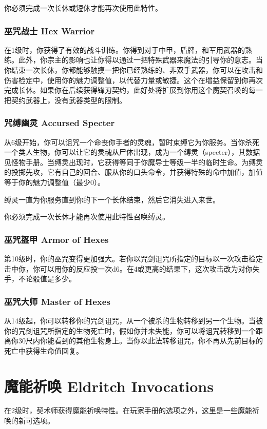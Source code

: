 你必须完成一次长休或短休才能再次使用此特性。

\subsubsection{巫咒战士 Hex Warrior}在1级时，你获得了有效的战斗训练。你得到对于中甲，盾牌，和军用武器的熟练。此外，你宗主的影响也让你得以通过一把特殊武器来魔法的引导你的意志。当你结束一次长休，你都能够触摸一把你已经熟练的、非双手武器，你可以在攻击和伤害检定中，使用你的魅力调整值，以代替力量或敏捷。这个在增益保留到你再次完成长休。如果你在后续获得锋刃契约，此好处将扩展到你用这个魔契召唤的每一把契约武器上，没有武器类型的限制。


\subsubsection{咒缚幽灵 Accursed Specter}从6级开始，你可以诅咒一个命丧你手者的灵魂，暂时束缚它为你服务。当你杀死一个类人生物，你可以让它的灵魂从尸体出现，成为一个缚灵（specter），其数据见怪物手册。当缚灵出现时，它获得等同于你魔导士等级一半的临时生命。为缚灵的投掷先攻，它有自己的回合、服从你的口头命令，并获得特殊的命中加值，加值等于你的魅力调整值（最少0）。

缚灵一直为你服务直到你的下一个长休结束，然后它消失进入来世。

你必须完成一次长休才能再次使用此特性召唤缚灵。

\subsubsection{巫咒盔甲 Armor of Hexes}第10级时，你的巫咒变得更加强大。若你以咒剑诅咒所指定的目标以一次攻击检定击中你，你可以用你的反应投一次d6。在4或更高的结果下，这次攻击改为对你失手，不论骰值是多少。

\subsubsection{巫咒大师 Master of Hexes}从14级起，你可以转移你的咒剑诅咒，从一个被杀的生物转移到另一个生物。当被你的咒剑诅咒所指定的生物死亡时，假如你并未失能，你可以将诅咒转移到一个距离你30尺内你能看到的其他生物身上。当你以此法转移诅咒，你不再从先前目标的死亡中获得生命值回复。

\section{魔能祈唤 Eldritch Invocations}在2级时，契术师获得魔能祈唤特性。在玩家手册的选项之外，这里是一些魔能祈唤的新可选项。

